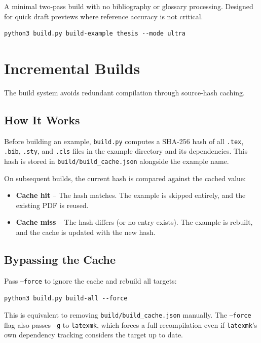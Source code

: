 A minimal two-pass build with no bibliography or glossary processing.  Designed
for quick draft previews where reference accuracy is not critical.

\begin{verbatim}
python3 build.py build-example thesis --mode ultra
\end{verbatim}

\section{Incremental Builds}
\label{sec:incremental-builds}

The build system avoids redundant compilation through source-hash caching.

\subsection{How It Works}

Before building an example, \texttt{build.py} computes a SHA-256 hash of all
\texttt{.tex}, \texttt{.bib}, \texttt{.sty}, and \texttt{.cls} files in the
example directory and its dependencies.  This hash is stored in
\texttt{build/build\_cache.json} alongside the example name.

On subsequent builds, the current hash is compared against the cached value:

\begin{itemize}
    \item \textbf{Cache hit} -- The hash matches.  The example is skipped
          entirely, and the existing PDF is reused.
    \item \textbf{Cache miss} -- The hash differs (or no entry exists).  The
          example is rebuilt, and the cache is updated with the new hash.
\end{itemize}

\subsection{Bypassing the Cache}

Pass \texttt{--force} to ignore the cache and rebuild all targets:

\begin{verbatim}
python3 build.py build-all --force
\end{verbatim}

This is equivalent to removing \texttt{build/build\_cache.json} manually.  The
\texttt{--force} flag also passes \texttt{-g} to \texttt{latexmk}, which forces
a full recompilation even if \texttt{latexmk}'s own dependency tracking
considers the target up to date.

